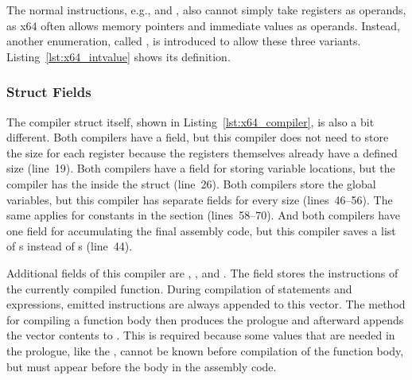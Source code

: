 The normal instructions, e.g.,  and , also cannot simply take registers as operands, as x64 often allows memory pointers and immediate values as operands.
Instead, another enumeration, called , is introduced to allow these three variants.
Listing~\ref{lst:x64_intvalue} shows its definition.

\subsubsection{Struct Fields}


The compiler struct itself, shown in Listing~\ref{lst:x64_compiler}, is also a bit different.
Both compilers have a  field, but this compiler does not need to store the size for each register because the registers themselves already have a defined size (line~19).
Both compilers have a  field for storing variable locations, but the \riscv{} compiler has the  inside the  struct (line~26).
Both compilers store the global variables, but this compiler has separate fields for every size (lines~46--56).
The same applies for constants in the  section (lines~58--70).
And both compilers have one field for accumulating the final assembly code, but this compiler saves a list of s instead of s (line~44).


Additional fields of this compiler are , , and .
The  field stores the instructions of the currently compiled function.
During compilation of statements and expressions, emitted instructions are always appended to this vector.
The method for compiling a function body then produces the prologue and afterward appends the vector contents to .
This is required because some values that are needed in the prologue, like the , cannot be known before compilation of the function body, but must appear before the body in the assembly code.

